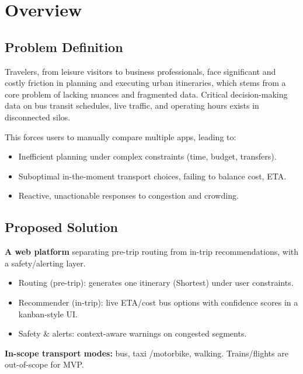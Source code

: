 \chapter{Overview}
\label{chap:overview}

\section{Problem Definition}
Travelers, from leisure visitors to business professionals, face significant and costly friction in
planning and executing urban itineraries, which stems from a core problem of lacking nuances and fragmented data.
Critical decision-making data on bus transit schedules, live traffic, and
operating hours exists in disconnected silos. 

This forces users to manually compare multiple apps, leading to:
\begin{itemize}
    \item Inefficient planning under complex constraints (time, budget, transfers).
    \item Suboptimal in-the-moment transport choices, failing to balance cost, ETA.
    \item Reactive, unactionable responses to congestion and crowding.
\end{itemize}
\section{Proposed Solution}
\textbf{A web platform} separating pre-trip routing from in-trip recommendations, with a safety/alerting layer.
\begin{itemize}
    \item Routing (pre-trip): generates one itinerary (Shortest) under user constraints.
    \item Recommender (in-trip): live ETA/cost bus options with confidence scores in a kanban-style UI.
    \item Safety $\&$ alerts: context-aware warnings on congested segments.
\end{itemize}
\textbf{In-scope transport modes:} bus, taxi /motorbike, walking. Trains/flights are out-of-scope for MVP.

